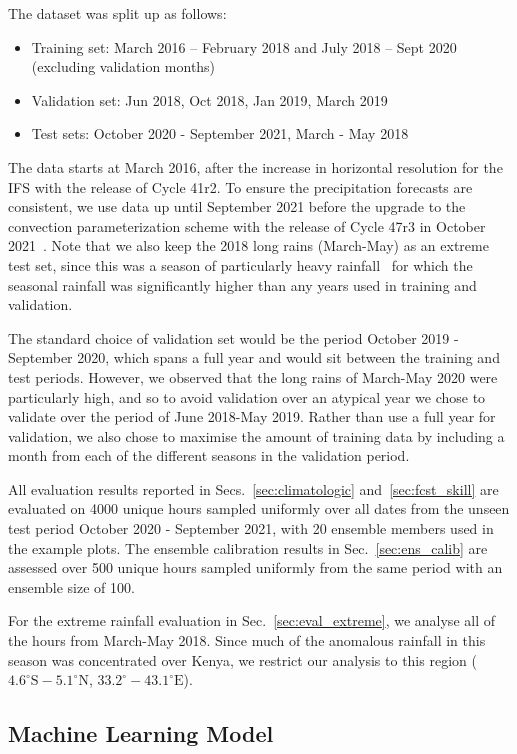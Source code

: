 \documentclass{article}
\begin{document}
The dataset was split up as follows:
\begin{itemize}
    \item Training set: March 2016 – February 2018 and July 2018 – Sept 2020 (excluding validation months)
    \item Validation set: Jun 2018, Oct 2018, Jan 2019, March 2019
    \item Test sets: October 2020 - September 2021, March - May 2018
\end{itemize}
The data starts at March 2016, after the increase in horizontal resolution for the IFS with the release of Cycle 41r2. To ensure the precipitation forecasts are consistent, we use data up until September 2021 before the upgrade to the convection parameterization scheme with the release of Cycle 47r3 in October 2021~\citep{ecmwf_changes_2023}. Note that we also keep the 2018 long rains (March-May) as an extreme test set, since this was a season of particularly heavy rainfall~\citep{kilavi_extreme_2018} for which the seasonal rainfall was significantly higher than any years used in training and validation. 

The standard choice of validation set would be the period October 2019 - September 2020, which spans a full year and would sit between the training and test periods. However, we observed that the long rains of March-May 2020 were particularly high, and so to avoid validation over an atypical year we chose to validate over the period of June 2018-May 2019. Rather than use a full year for validation, we also chose to maximise the amount of training data by including a month from each of the different seasons in the validation period.

All evaluation results reported in Secs.~\ref{sec:climatologic} and~\ref{sec:fcst_skill} are evaluated on 4000 unique hours sampled uniformly over all dates from the unseen test period October 2020 - September 2021, with 20 ensemble members used in the example plots. The ensemble calibration results in Sec.~\ref{sec:ens_calib} are assessed over 500 unique hours sampled uniformly from the same period with an ensemble size of 100.

For the extreme rainfall evaluation in Sec.~\ref{sec:eval_extreme}, we analyse all of the hours from March-May 2018. Since much of the anomalous rainfall in this season was concentrated over Kenya, we restrict our analysis to this region ($4.6^{\circ}\text{S}-5.1^{\circ}\text{N}$, $33.2^{\circ}-43.1^{\circ}\text{E}$).


\subsection{Machine Learning Model}
\end{document}
